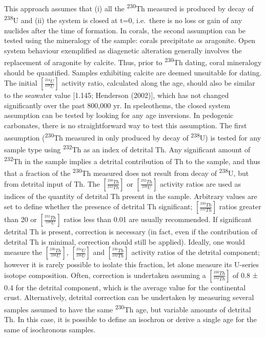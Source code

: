 \documentclass[]{elsarticle} %
\begin{document}
This approach assumes that (i) all the \textsuperscript{230}Th measured is produced by decay of \textsuperscript{238}U and (ii) the system is closed at t=0, i.e.~there is no loss or gain of any nuclides after the time of formation.
In corals, the second assumption can be tested using the mineralogy of the sample: corals precipitate as aragonite. Open system behaviour exemplified as diagenetic alteration generally involves the replacement of aragonite by calcite. Thus, prior to \textsuperscript{230}Th dating, coral mineralogy should be quantified. Samples exhibiting calcite are deemed unsuitable for dating. The initial \([\frac{^{234}U}{^{238}U}]\) activity ratio, calculated along the age, should also be similar to the seawater value {[}1.145; Henderson (2002){]}, which has not changed significantly over the past 800,000 yr. In speleothems, the closed system assumption can be tested by looking for any age inversions. In pedogenic carbonates, there is no straightforward way to test this assumption.
The first assumption (\textsuperscript{230}Th measured in only produced by decay of \textsuperscript{238}U) is tested for any sample type using \textsuperscript{232}Th as an index of detrital Th. Any significant amount of \textsuperscript{232}Th in the sample implies a detrital contribution of Th to the sample, and thus that a fraction of the \textsuperscript{230}Th measured does not result from decay of \textsuperscript{238}U, but from detrital input of Th. The \([\frac{^{230}Th}{^{232}Th}]\) or \([\frac{^{232}Th}{^{238}U}]\) activity ratios are used as indices of the quantity of detrital Th present in the sample. Arbitrary values are set to define whether the presence of detrital Th significant; \([\frac{^{230}Th}{^{232}Th}]\) ratios greater than 20 or \([\frac{^{232}Th}{^{238}U}]\) ratios less than 0.01 are usually recommended. If significant detrital Th is present, correction is necessary (in fact, even if the contribution of detrital Th is minimal, correction should still be applied). Ideally, one would measure the \([\frac{^{230}Th}{^{238}U}]\), \([\frac{^{234}U}{^{238}U}]\) and \([\frac{^{230}Th}{^{232}Th}]\) activity ratios of the detrital component; however it is rarely possible to isolate this fraction, let alone measure its U-series isotope composition. Often, correction is undertaken assuming a \([\frac{^{230}Th}{^{232}Th}]\) of 0.8 ± 0.4 for the detrital component, which is the average value for the continental crust. Alternatively, detrital correction can be undertaken by measuring several samples assumed to have the same \textsuperscript{230}Th age, but variable amounts of detrital Th. In this case, it is possible to define an isochron or derive a single age for the same of isochronous samples.
\end{document}
